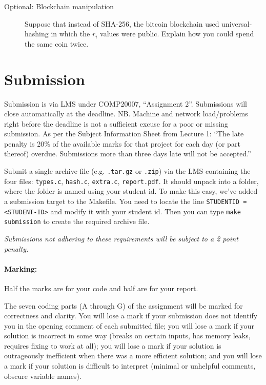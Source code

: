 \documentclass[11pt]{article}
\begin{document}
\begin{description}
\item[Optional: Blockchain manipulation]  Suppose that instead of SHA-256,
    the bitcoin blockchain used universal-hashing in which the $r_i$ values were public.
        Explain how you could spend the same coin twice.


\end{description}

\section*{Submission}

Submission is via LMS under COMP20007, ``Assignment 2''.
Submissions will close automatically at the deadline.
NB\@. Machine and network load/problems right before the deadline is
not a sufficient excuse for a poor or missing submission.
As per the Subject Information Sheet from Lecture 1: ``The late penalty is 20\%
of the available marks for that project
for each day (or part thereof) overdue.
Submissions more than three days late will not be accepted.''

Submit a single archive file (e.g. \texttt{.tar.gz} or \texttt{.zip}) via the
LMS containing the four files:
\texttt{types.c},
\texttt{hash.c},
\texttt{extra.c},
\texttt{report.pdf}.
It should unpack into a folder, where the folder is named using your student id.
To make this easy, we've added a submission target to the Makefile.
You need to locate the line \texttt{STUDENTID = <STUDENT-ID>} and modify it with your student id.
Then you can type \texttt{make submission} to create the required archive file.

\emph{Submissions not adhering to these requirements will be subject to a 2 point penalty.}

\paragraph{Marking:}
Half the marks are for your code and half are for your report.

The seven coding parts (A through G) of the assignment will be marked for correctness and clarity.
You will lose a mark if your submission does not identify you in the opening comment of each submitted file;
you will lose a mark if your solution is incorrect in some way
(breaks on certain inputs, has memory leaks, requires fixing to work at all);
you will lose a mark if your solution is outrageously inefficient when there was a more efficient solution;
and you will lose a mark if your solution is difficult to interpret
(minimal or unhelpful comments, obscure variable names).
\end{document}
